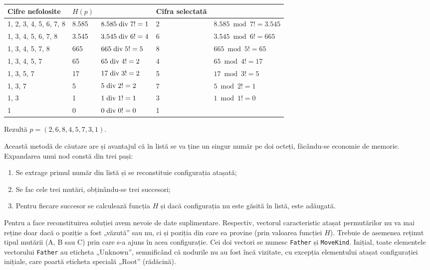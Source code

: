 \begin{table}[H]
  \centering
  \small
  \begin{tabular}{|l|l|l|l|l|}
    \hline
    Cifre nefolosite       & $H(p)$ &                      & Cifra selectată & \\ \hline
    1, 2, 3, 4, 5, 6, 7, 8 & 8.585  & $8.585 \bdiv 7! = 1$ & 2 & $8.585 \bmod 7! = 3.545$ \\
    1, 3, 4, 5, 6, 7, 8    & 3.545  & $3.545 \bdiv 6! = 4$ & 6 & $3.545 \bmod 6! = 665$ \\
    1, 3, 4, 5, 7, 8       & 665    & $665 \bdiv 5! = 5$   & 8 & $665 \bmod 5! = 65$ \\
    1, 3, 4, 5, 7          & 65     & $65 \bdiv 4! = 2$    & 4 & $65 \bmod 4! = 17$ \\
    1, 3, 5, 7             & 17     & $17 \bdiv 3! = 2$    & 5 & $17 \bmod 3! = 5$ \\
    1, 3, 7                & 5      & $5 \bdiv 2! = 2$     & 7 & $5 \bmod 2! = 1$ \\
    1, 3                   & 1      & $1 \bdiv 1! = 1$     & 3 & $1 \bmod 1! = 0$ \\
    1                      & 0      & $0 \bdiv 0! = 0$     & 1 & \\ \hline
  \end{tabular}
\end{table}

Rezultă $p = (2, 6, 8, 4, 5, 7, 3, 1)$.

Această metodă de căutare are și avantajul că în listă se va ține un singur
număr pe doi octeți, făcându-se economie de memorie. Expandarea unui nod
constă din trei pași:

\begin{enumerate}

\item Se extrage primul număr din listă și se reconstituie configurația
  atașată;

\item Se fac cele trei mutări, obținându-se trei succesori;

\item Pentru fiecare succesor se calculează funcția $H$ și dacă configurația
  nu este găsită în listă, este adăugată.

\end{enumerate}

Pentru a face reconstituirea soluției avem nevoie de date
suplimentare. Respectiv, vectorul caracteristic atașat permutărilor nu va mai
reține doar dacă o poziție a fost „văzută” sau nu, ci și poziția din care ea
provine (prin valoarea funcției $H$). Trebuie de asemenea reținut tipul
mutării (A, B sau C) prin care s-a ajuns în acea configurație. Cei doi vectori
se numesc {\tt Father} și {\tt MoveKind}. Inițial, toate elementele vectorului
{\tt Father} au eticheta „Unknown”, semnificând că nodurile nu au fost încă
vizitate, cu excepția elementului atașat configurației inițiale, care poartă
eticheta specială „Root” (rădăcină).


